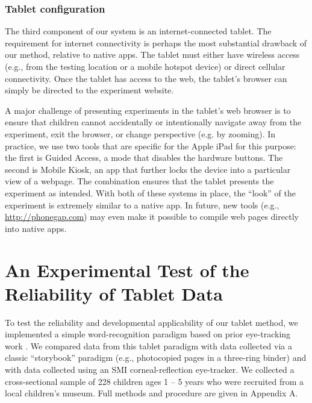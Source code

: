 \documentclass[man,noapacite]{apa2}
\begin{document}
\subsubsection{Tablet configuration}

The third component of our system is an internet-connected tablet. The requirement for internet connectivity is perhaps the most substantial drawback of our method, relative to native apps. The tablet must either have wireless access (e.g., from the testing location or a mobile hotspot device) or direct cellular connectivity. Once the tablet has access to the web, the tablet's browser can simply be directed to the experiment website. 

A major challenge of presenting experiments in the tablet's web browser is to ensure that children cannot accidentally or intentionally navigate away from the experiment, exit the browser, or change perspective (e.g. by zooming). In practice, we use two tools that are specific for the Apple iPad for this purpose: the first is Guided Access, a mode that disables the hardware buttons. The second is Mobile Kiosk, an app that further locks the device into a particular view of a webpage. The combination ensures that the tablet presents the experiment as intended. With both of these systems in place, the ``look'' of the experiment is extremely similar to a native app. In future, new tools (e.g., \url{http://phonegap.com}) may even make it possible to compile web pages directly into native apps.

\section{An Experimental Test of the Reliability of Tablet Data}
 
To test the reliability and developmental applicability of our tablet method, we implemented a simple word-recognition paradigm based on prior eye-tracking work \cite{fernald1998,fernald2006,bion2013}. We compared data from this tablet paradigm with data collected via a classic ``storybook'' paradigm (e.g., photocopied pages in a three-ring binder) and with data collected using an SMI corneal-reflection eye-tracker. We collected a cross-sectional sample of 228 children ages 1 -- 5 years who were recruited from a local children's museum. Full methods and procedure are given in Appendix A. 
\end{document}
